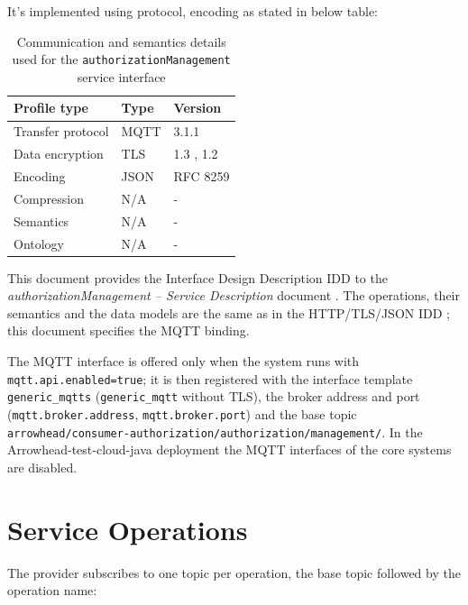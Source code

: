 \documentclass[a4paper]{arrowhead}
\begin{document}
It's implemented using protocol, encoding as stated in below table:
\begin{table}[ht!]
  \centering
  \begin{tabular}{|l|l|l|}
    \hline
    \rowcolor{gray!33} Profile type & Type & Version \\ \hline
    Transfer protocol & MQTT & 3.1.1 \cite{mqtt311} \\ \hline
    Data encryption & TLS & 1.3 \cite{rfc8446}, 1.2 \cite{rfc5246} \\ \hline
    Encoding & JSON & RFC 8259 \cite{rfc8259} \\ \hline
    Compression & N/A & - \\ \hline
    Semantics & N/A & - \\ \hline
    Ontology & N/A & - \\ \hline
  \end{tabular}
  \caption{Communication and semantics details used for the \texttt{authorization\allowbreak{}Management} service interface}
  \label{tab:comunication_semantics_profile}
\end{table}

This document provides the Interface Design Description IDD to the \textit{authorizationManagement -- Service Description} document \cite{ca-authorizationManagement-sd}.
The operations, their semantics and the data models are the same as in the HTTP/TLS/JSON IDD \cite{ca-authorizationManagement-http-idd}; this document specifies the MQTT binding.

The MQTT interface is offered only when the system runs with \texttt{mqtt.api.enabled=true}; it is then registered with the interface template \texttt{generic\_\allowbreak{}mqtts} (\texttt{generic\_\allowbreak{}mqtt} without TLS), the broker address and port (\texttt{mqtt.\allowbreak{}broker.\allowbreak{}address}, \texttt{mqtt.\allowbreak{}broker.\allowbreak{}port}) and the base topic \texttt{arrowhead/\allowbreak{}consumer-\allowbreak{}authorization/\allowbreak{}authorization/\allowbreak{}management/\allowbreak{}}. In the Arrowhead-test-cloud-java deployment the MQTT interfaces of the core systems are disabled.

\newpage

\section{Service Operations}
\label{sec:operations}

The provider subscribes to one topic per operation, the base topic followed by the operation name:
\end{document}
